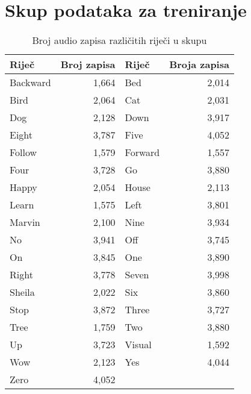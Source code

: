 \chapter{Skup podataka za treniranje}


\begin{table}[htb]
    \centering
    \begin{tabular}{|l|r|l|r|}
        \hline
        \textbf{Riječ} & \textbf{Broj zapisa} & \textbf{Riječ} & \textbf{Broja zapisa} \\ \hline
        Backward & 1,664 & Bed & 2,014 \\ \hline
        Bird & 2,064 & Cat & 2,031 \\ \hline
        Dog & 2,128 & Down & 3,917 \\ \hline
        Eight & 3,787 & Five & 4,052 \\ \hline
        Follow & 1,579 & Forward & 1,557 \\ \hline
        Four & 3,728 & Go & 3,880 \\ \hline
        Happy & 2,054 & House & 2,113 \\ \hline
        Learn & 1,575 & Left & 3,801 \\ \hline
        Marvin & 2,100 & Nine & 3,934 \\ \hline
        No & 3,941 & Off & 3,745 \\ \hline
        On & 3,845 & One & 3,890 \\ \hline
        Right & 3,778 & Seven & 3,998 \\ \hline
        Sheila & 2,022 & Six & 3,860 \\ \hline
        Stop & 3,872 & Three & 3,727 \\ \hline
        Tree & 1,759 & Two & 3,880 \\ \hline
        Up & 3,723 & Visual & 1,592 \\ \hline
        Wow & 2,123 & Yes & 4,044 \\ \hline
        Zero & 4,052 & & \\ \hline
        \end{tabular}
    \caption{Broj audio zapisa različitih riječi u skupu \cite{speechcommandsv2}}
    \label{tab:word_frequency}
\end{table}